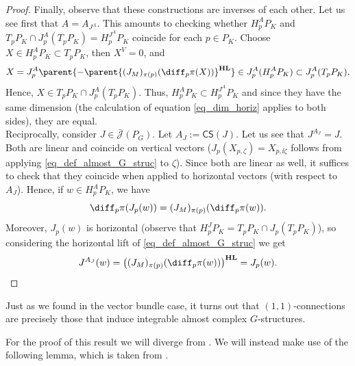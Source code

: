 \begin{proof}
    Finally, observe that these constructions are inverses of each other. Let us see first that \(A=A_{J^A}\). This amounts to checking whether \(H^A_p P_K\) and \(T_pP_K \cap J_p^A(T_pP_K)=H^{J^A}_pP_K\) coincide for each \(p \in P_K\). Choose \(X \in H^A_pP_K\subset T_pP_K\), then \(X^V=0\), and 
    \[
    X=J^A_p\parent{-\parent{(J_M)_{\pi(p)}(\diff_p\pi(X))}^{\mathbf{HL}}} \in J_p^A(H_p^AP_K)\subset J_p^A(T_pP_K).
    \]
    Hence, \(X \in T_pP_K \cap J_p^A(T_pP_K)\). Thus, \(H^A_p P_K \subset H^{J^A}_pP_K\) and since they have the same dimension (the calculation of equation \eqref{eq_dim_horiz} applies to both sides), they are equal. \\

    Reciprocally, consider \(J \in \bar{\mathscr{J}}(P_G)\). Let \(A_J:=\mathsf{CS}(J)\). Let us see that \(J^{A_J}=J\). Both are linear and coincide on vertical vectors (\(J_p(X_{p,\zeta})=X_{p, \ii \zeta}\) follows from applying \eqref{eq_def_almost_G_struc} to \(\zeta\)). Since both are linear as well, it suffices to check that they coincide when applied to horizontal vectors (with respect to \(A_J\)). Hence, if \(w \in H_p^AP_K\), we have 
    \begin{equation} \label{eq_prueba_CS_1}
    \diff_p\pi(J_p(w))=(J_M)_{\pi(p)}(\diff_p\pi(w)). 
    \end{equation}
    Moreover, \(J_p(w)\) is horizontal (observe that \(H^J_pP_K= T_pP_K\cap J_p(T_pP_K)\)), so considering the horizontal lift of \eqref{eq_def_almost_G_struc} we get
    \[
    J^{A_J}(w)=\big((J_{M})_{\pi(p)}(\diff_p \pi(w)) \big)^{\mathbf{HL}}=J_p(w).
    \]
\end{proof}

Just as we found in the vector bundle case, it turns out that \((1,1)\)-connections are precisely those that induce integrable almost complex \(G\)-structures.

For the proof of this result we will diverge from \parencite{Sandon_Chern_Correspondence}. We will instead make use of the following lemma, which is taken from \parencite{teleman_Newlander_Niremberg}.

